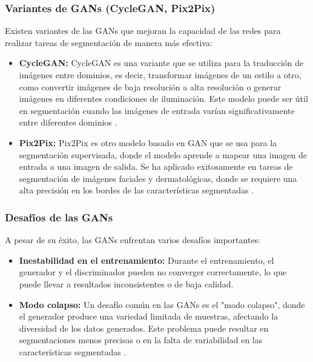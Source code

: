 \subsubsection{Variantes de GANs (CycleGAN, Pix2Pix)}  
Existen variantes de las GANs que mejoran la capacidad de las redes para realizar tareas de segmentación de manera más efectiva:
\begin{itemize}
    \item \textbf{CycleGAN:} CycleGAN es una variante que se utiliza para la traducción de imágenes entre dominios, es decir, transformar imágenes de un estilo a otro, como convertir imágenes de baja resolución a alta resolución o generar imágenes en diferentes condiciones de iluminación. Este modelo puede ser útil en segmentación cuando las imágenes de entrada varían significativamente entre diferentes dominios \cite{autor2019cyclegan}.
    \item \textbf{Pix2Pix:} Pix2Pix es otro modelo basado en GAN que se usa para la segmentación supervisada, donde el modelo aprende a mapear una imagen de entrada a una imagen de salida. Se ha aplicado exitosamente en tareas de segmentación de imágenes faciales y dermatológicas, donde se requiere una alta precisión en los bordes de las características segmentadas \cite{autor2019pix2pix}.
\end{itemize}

\subsubsection{Desafíos de las GANs}  
A pesar de su éxito, las GANs enfrentan varios desafíos importantes:
\begin{itemize}
    \item \textbf{Inestabilidad en el entrenamiento:} Durante el entrenamiento, el generador y el discriminador pueden no converger correctamente, lo que puede llevar a resultados inconsistentes o de baja calidad.
    \item \textbf{Modo colapso:} Un desafío común en las GANs es el "modo colapso", donde el generador produce una variedad limitada de muestras, afectando la diversidad de los datos generados. Este problema puede resultar en segmentaciones menos precisas o en la falta de variabilidad en las características segmentadas \cite{autor2022challenges_gans}.
\end{itemize}


